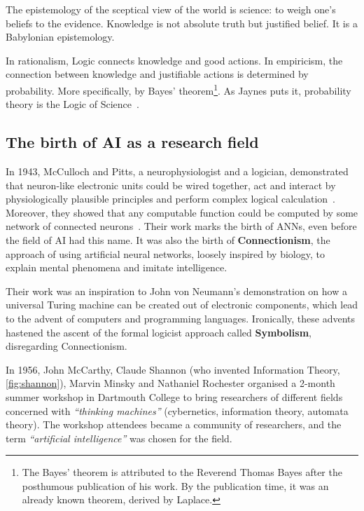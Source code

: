 The epistemology of the sceptical view of the world is science: to weigh one's beliefs to the evidence. Knowledge is not absolute truth but justified belief. It is a Babylonian epistemology.

In rationalism, Logic connects knowledge and good actions. In empiricism, the connection between knowledge and justifiable actions is determined by probability. More specifically, by Bayes' theorem\footnote{The Bayes' theorem is attributed to the Reverend Thomas Bayes after the posthumous publication of his work. By the publication time, it was an already known theorem, derived by Laplace.}. As Jaynes puts it, probability theory is the Logic of Science~\cite{jaynes:2003}.
\subsection{The birth of AI as a research field}

In 1943, McCulloch and Pitts, a neurophysiologist and a logician, demonstrated that neuron-like electronic units could be wired together, act and interact by physiologically plausible principles and perform complex logical calculation~\cite{russell:2010}. Moreover, they showed that any computable function could be computed by some network of connected neurons~\cite{mcculloch:1943}. Their work marks the birth of \acfp{ANN}, even before the field of AI had this name. It was also the birth of \textbf{Connectionism}, the approach of using artificial neural networks, loosely inspired by biology, to explain mental phenomena and imitate intelligence.

Their work was an inspiration to John von Neumann's demonstration on how a universal Turing machine can be created out of electronic components, which lead to the advent of computers and programming languages. Ironically, these advents hastened the ascent of the formal logicist approach called \textbf{Symbolism}, disregarding Connectionism.

In 1956, John McCarthy, Claude Shannon (who invented Information Theory, \cref{fig:shannon}), Marvin Minsky and Nathaniel Rochester organised a 2-month summer workshop in Dartmouth College to bring researchers of different fields concerned with \emph{``thinking machines''} (cybernetics, information theory, automata theory). The workshop attendees became a community of researchers, and the term \emph{``artificial intelligence''} was chosen for the field.
